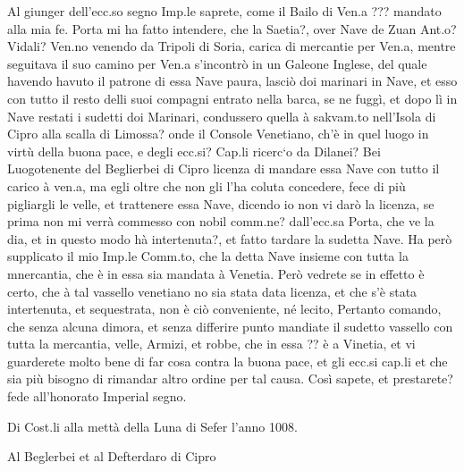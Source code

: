 Al giunger  dell'ecc.so segno Imp.le  saprete, come il Bailo  di Ven.a
??? mandato alla mia fe. Porta  mi ha fatto intendere, che la Saetia?,
over Nave de  Zuan Ant.o? Vidali? Ven.no venendo  da Tripoli di Soria,
carica  di mercantie  per Ven.a,  mentre seguitava  il suo  camino per
Ven.a s'incontrò  in un Galeone  Inglese, del quale havendo  havuto il
patrone di essa  Nave paura, lasciò doi marinari in  Nave, et esso con
tutto il resto  delli suoi compagni entrato nella  barca, se ne fuggì,
et dopo lì in Nave restati i sudetti doi Marinari, condussero quella à
sakvam.to nell'Isola di Cipro alla scalla di Limossa?  onde il Console
Venetiano,  ch'è in  quel luogo  in virtù  della buona  pace,  e degli
ecc.si?  Cap.li ricerc`o da  Dilanei?  Bei Luogotenente del Beglierbei
di Cipro licenza di mandare essa  Nave con tutto il carico à ven.a, ma
egli oltre che  non gli l'ha coluta concedere,  fece di più pigliargli
le velle, et trattenere essa Nave,  dicendo io non vi darò la licenza,
se prima non mi verrà  commesso con nobil comm.ne?  dall'ecc.sa Porta,
che ve la dia, et in  questo modo hà intertenuta?, et fatto tardare la
sudetta Nave. Ha  però supplicato il mio Imp.le  Comm.to, che la detta
Nave insieme  con tutta  la mnercantia,  che è in  essa sia  mandata à
Venetia.  Però vedrete  se  in effetto  è  certo, che  à tal  vassello
venetiano no sia stata data  licenza, et che s'è stata intertenuta, et
sequestrata, non  è ciò conveniente, né lecito,  Pertanto comando, che
senza  alcuna dimora,  et senza  differire punto  mandiate  il sudetto
vassello con tutta la mercantia,  velle, Armizi, et robbe, che in essa
?? è  a Vinetia,  et vi guarderete  molto bene  di far cosa  contra la
buona pace,  et gli ecc.si cap.li  et che sia più  bisogno di rimandar
altro  ordine  per  tal   causa.  Così  sapete,  et  prestarete?  fede
all'honorato Imperial segno.

Di Cost.li alla mettà della Luna di Sefer l'anno 1008.



\begin{center}
Al Beglerbei et al Defterdaro di Cipro
\end{center}

